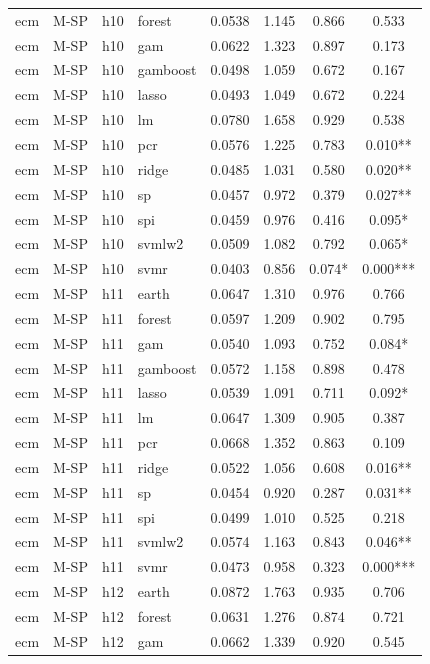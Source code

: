 \begin{ThreePartTable}
\begin{longtable}[t]{llclcccc}
ecm & M-SP & h10 & forest & 0.0538 & 1.145 & 0.866 & 0.533\\
ecm & M-SP & h10 & gam & 0.0622 & 1.323 & 0.897 & 0.173\\
ecm & M-SP & h10 & gamboost & 0.0498 & 1.059 & 0.672 & 0.167\\
ecm & M-SP & h10 & lasso & 0.0493 & 1.049 & 0.672 & 0.224\\
ecm & M-SP & h10 & lm & 0.0780 & 1.658 & 0.929 & 0.538\\
ecm & M-SP & h10 & pcr & 0.0576 & 1.225 & 0.783 & 0.010**\\
ecm & M-SP & h10 & ridge & 0.0485 & 1.031 & 0.580 & 0.020**\\
ecm & M-SP & h10 & sp & 0.0457 & 0.972 & 0.379 & 0.027**\\
ecm & M-SP & h10 & spi & 0.0459 & 0.976 & 0.416 & 0.095*\\
ecm & M-SP & h10 & svmlw2 & 0.0509 & 1.082 & 0.792 & 0.065*\\
ecm & M-SP & h10 & svmr & 0.0403 & 0.856 & 0.074* & 0.000***\\
\addlinespace
ecm & M-SP & h11 & earth & 0.0647 & 1.310 & 0.976 & 0.766\\
ecm & M-SP & h11 & forest & 0.0597 & 1.209 & 0.902 & 0.795\\
ecm & M-SP & h11 & gam & 0.0540 & 1.093 & 0.752 & 0.084*\\
ecm & M-SP & h11 & gamboost & 0.0572 & 1.158 & 0.898 & 0.478\\
ecm & M-SP & h11 & lasso & 0.0539 & 1.091 & 0.711 & 0.092*\\
ecm & M-SP & h11 & lm & 0.0647 & 1.309 & 0.905 & 0.387\\
ecm & M-SP & h11 & pcr & 0.0668 & 1.352 & 0.863 & 0.109\\
ecm & M-SP & h11 & ridge & 0.0522 & 1.056 & 0.608 & 0.016**\\
ecm & M-SP & h11 & sp & 0.0454 & 0.920 & 0.287 & 0.031**\\
ecm & M-SP & h11 & spi & 0.0499 & 1.010 & 0.525 & 0.218\\
ecm & M-SP & h11 & svmlw2 & 0.0574 & 1.163 & 0.843 & 0.046**\\
ecm & M-SP & h11 & svmr & 0.0473 & 0.958 & 0.323 & 0.000***\\
\addlinespace
ecm & M-SP & h12 & earth & 0.0872 & 1.763 & 0.935 & 0.706\\
ecm & M-SP & h12 & forest & 0.0631 & 1.276 & 0.874 & 0.721\\
ecm & M-SP & h12 & gam & 0.0662 & 1.339 & 0.920 & 0.545\\

\end{longtable}
\end{ThreePartTable}
